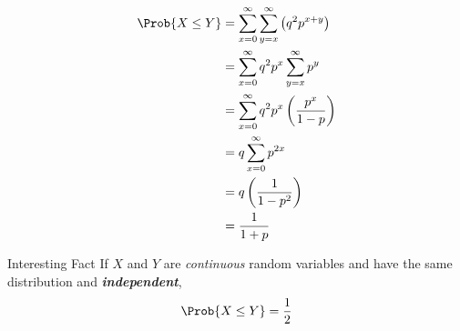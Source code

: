 \begin{Example}{}{}
\begin{enumerate}[label=(\roman*)]
              \begin{align*}
                  \Prob{X\le Y}
                   & =
                  \sum\limits_{x=0}^{\infty}
                  \sum\limits_{y=x}^{\infty}\left( q^2 p^{x+y} \right) \\
                   & =\sum\limits_{x=0}^{\infty} q^2p^x
                  \sum\limits_{y=x}^{\infty} p^y                       \\
                   & =\sum\limits_{x=0}^{\infty}
                  q^2p^x\left( \frac{p^x}{1-p}  \right)                \\
                   & =q\sum\limits_{x=0}^{\infty} p^{2x}               \\
                   & =q\left( \frac{1}{1-p^2}  \right)                 \\
                   & =\frac{1}{1+p}
              \end{align*}

    \end{enumerate}
\end{Example}
\begin{Remark}{Interesting Fact}{}
    If $ X $ and $ Y $ are \emph{continuous} random variables
    and have the same distribution and \emph{\textbf{independent}},
    \[ \Prob{X\le Y}=\frac{1}{2} \]
\end{Remark}

